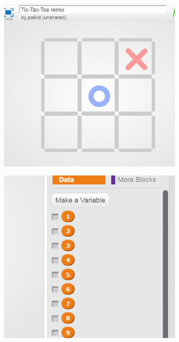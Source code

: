 \documentclass[conference]{IEEEtran}
\begin{document}
\begin{figure}[!h]
	\centering
	\begin{subfigure}{.5\columnwidth}
		\includegraphics[width=\columnwidth]{fig/tic_1}%
	\end{subfigure}\hfil%
	\begin{subfigure}{.5\columnwidth}
		\includegraphics[width=\columnwidth]{fig/tic_2}%

\end{subfigure}
\end{figure}
\end{document}
